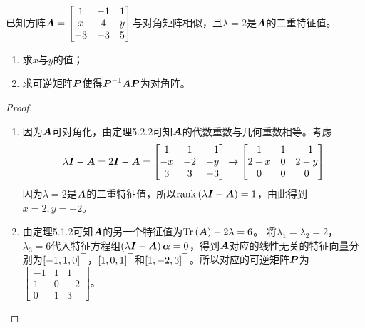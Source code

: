 \begin{problem}
已知方阵\(\boldsymbol{A}=\begin{bmatrix}1&-1&1\\x&4&y\\-3&-3&5\end{bmatrix}\)与对角矩阵相似，且\(\lambda=2\)是\(\boldsymbol{A}\)的二重特征值。
\begin{enumerate}
    \item 求\(x\)与\(y\)的值；
    \item 求可逆矩阵\(\boldsymbol{P}\)使得\({\boldsymbol{P}}^{-1}\boldsymbol{A}\boldsymbol{P}\)为对角阵。
\end{enumerate}
\end{problem}
\begin{proof}
    \begin{enumerate}
        \item {
              因为\(\boldsymbol{A}\)可对角化，由定理5.2.2可知\(\boldsymbol{A}\)的代数重数与几何重数相等。考虑
              \begin{equation*}
                  \lambda\boldsymbol{I}-\boldsymbol{A}=2\boldsymbol{I}-\boldsymbol{A}=
                  \begin{bmatrix}
                      1  & 1  & -1 \\
                      -x & -2 & -y \\
                      3  & 3  & -3
                  \end{bmatrix}\to
                  \begin{bmatrix}
                      1   & 1 & -1  \\
                      2-x & 0 & 2-y \\
                      0   & 0 & 0
                  \end{bmatrix}
              \end{equation*}
              因为\(\lambda=2\)是\(\boldsymbol{A}\)的二重特征值，所以\(\mathrm{rank}\left( \lambda\boldsymbol{I}-\boldsymbol{A} \right)=1\)，由此得到\(x=2,y=-2\)。
              }
        \item {
              由定理5.1.2可知\(\boldsymbol{A}\)的另一个特征值为\(\mathrm{Tr}\left( \boldsymbol{A} \right)-2\lambda=6\)。
              将\(\lambda_1=\lambda_2=2\)，\(\lambda_3=6\)代入特征方程组\(\left( \lambda\boldsymbol{I}-\boldsymbol{A} \right)\boldsymbol{\alpha}=0\)，得到\(\boldsymbol{A}\)对应的线性无关的特征向量分别为\(\left[ -1,1,0 \right]^\top\)，\(\left[ 1,0,1 \right]^\top\)和\(\left[ 1,-2,3 \right]^\top\)。所以对应的可逆矩阵\(\boldsymbol{P}\)为\(\begin{bmatrix}-1&1&1\\1&0&-2\\0&1&3\end{bmatrix}\)。
              }
    \end{enumerate}
\end{proof}

